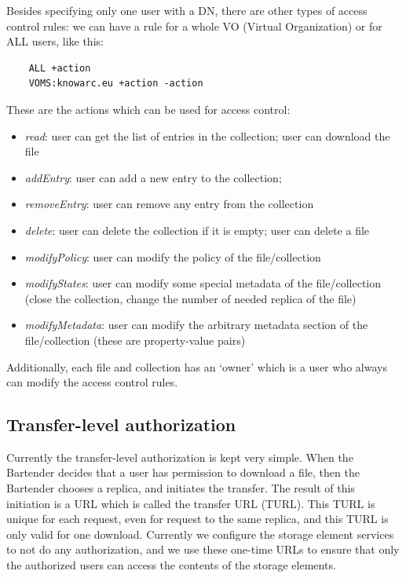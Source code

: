 \documentclass{book}
\begin{document}
Besides specifying only one user with a DN, there are other types of access control rules: we can have a rule for a whole VO (Virtual Organization) or for ALL users, like this:

\begin{verbatim}
    ALL +action
    VOMS:knowarc.eu +action -action 
\end{verbatim}

These are the actions which can be used for access control:
\begin{itemize}
    \item \emph{read}: user can get the list of entries in the collection; user can download the file
    \item \emph{addEntry}: user can add a new entry to the collection;
    \item \emph{removeEntry}: user can remove any entry from the collection 
    \item \emph{delete}: user can delete the collection if it is empty; user can delete a file
    \item \emph{modifyPolicy}: user can modify the policy of the file/collection
    \item \emph{modifyStates}: user can modify some special metadata of the file/collection (close the collection, change the number of needed replica of the file)
    \item \emph{modifyMetadata}: user can modify the arbitrary metadata section of the file/collection (these are property-value pairs)
\end{itemize}

Additionally, each file and collection has an `owner' which is a user who always can modify the access control rules.



\subsection{Transfer-level authorization} %
\label{sub:transfer_level_authorization}

Currently the transfer-level authorization is kept very simple. When the Bartender decides that a user has permission to download a file, then the Bartender chooses a replica, and initiates the transfer. The result of this initiation is a URL which is called the transfer URL (TURL). This TURL is unique for each request, even for request to the same replica, and this TURL is only valid for one download. Currently we configure the storage element services to not do any authorization, and we use these one-time URLs to ensure that only the authorized users can access the contents of the storage elements. 
\end{document}
